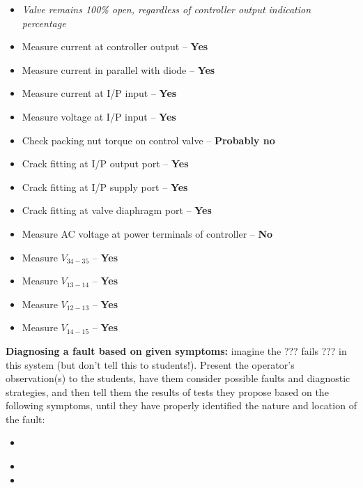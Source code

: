 \documentclass[12pt,a4paper]{article}
\begin{document}
\begin{itemize}
\item{} {\it Valve remains 100\% open, regardless of controller output indication percentage}
\item{} Measure current at controller output -- {\bf Yes}
\item{} Measure current in parallel with diode -- {\bf Yes}
\item{} Measure current at I/P input -- {\bf Yes}
\item{} Measure voltage at I/P input -- {\bf Yes}
\item{} Check packing nut torque on control valve -- {\bf Probably no}
\item{} Crack fitting at I/P output port -- {\bf Yes}
\item{} Crack fitting at I/P supply port -- {\bf Yes}
\item{} Crack fitting at valve diaphragm port -- {\bf Yes}
\item{} Measure AC voltage at power terminals of controller -- {\bf No}
\item{} Measure $V_{34-35}$ -- {\bf Yes}
\item{} Measure $V_{13-14}$ -- {\bf Yes}
\item{} Measure $V_{12-13}$ -- {\bf Yes}
\item{} Measure $V_{14-15}$ -- {\bf Yes}
\end{itemize}


\vskip 10pt


\noindent
{\bf Diagnosing a fault based on given symptoms:} imagine the ??? fails ??? in this system (but don't tell this to students!).  Present the operator's observation(s) to the students, have them consider possible faults and diagnostic strategies, and then tell them the results of tests they propose based on the following symptoms, until they have properly identified the nature and location of the fault:

\begin{itemize}
\item{} {\it }
\item{} 
\item{} 
\end{itemize}


\vfil \eject 
\end{document}
